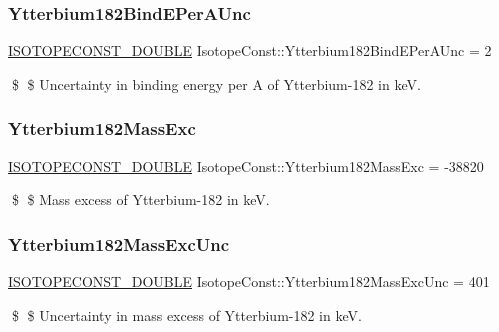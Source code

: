 \subsubsection{\texorpdfstring{Ytterbium182\+Bind\+E\+Per\+A\+Unc}{Ytterbium182BindEPerAUnc}}
{\footnotesize\ttfamily \mbox{\hyperlink{group___isotope_const-_macros_ga8f45a7272ce02c0b4c65c44636ed719a}{I\+S\+O\+T\+O\+P\+E\+C\+O\+N\+S\+T\+\_\+\+D\+O\+U\+B\+LE}} Isotope\+Const\+::\+Ytterbium182\+Bind\+E\+Per\+A\+Unc = 2}

\$ \$ Uncertainty in binding energy per A of Ytterbium-\/182 in keV. \mbox{\label{group___isotope_const-_ytterbium-_yb182_ga1ab03c64c18a8cf325e120ad5af5adf2}} 
\subsubsection{\texorpdfstring{Ytterbium182\+Mass\+Exc}{Ytterbium182MassExc}}
{\footnotesize\ttfamily \mbox{\hyperlink{group___isotope_const-_macros_ga8f45a7272ce02c0b4c65c44636ed719a}{I\+S\+O\+T\+O\+P\+E\+C\+O\+N\+S\+T\+\_\+\+D\+O\+U\+B\+LE}} Isotope\+Const\+::\+Ytterbium182\+Mass\+Exc = -\/38820}

\$ \$ Mass excess of Ytterbium-\/182 in keV. \mbox{\label{group___isotope_const-_ytterbium-_yb182_ga4510aca4ad5afcd95436fcb20fbb6d40}} 
\subsubsection{\texorpdfstring{Ytterbium182\+Mass\+Exc\+Unc}{Ytterbium182MassExcUnc}}
{\footnotesize\ttfamily \mbox{\hyperlink{group___isotope_const-_macros_ga8f45a7272ce02c0b4c65c44636ed719a}{I\+S\+O\+T\+O\+P\+E\+C\+O\+N\+S\+T\+\_\+\+D\+O\+U\+B\+LE}} Isotope\+Const\+::\+Ytterbium182\+Mass\+Exc\+Unc = 401}

\$ \$ Uncertainty in mass excess of Ytterbium-\/182 in keV. \mbox{\label{group___isotope_const-_ytterbium-_yb182_gae7527bef6dedfffea9e974b1bab831fd}} 
